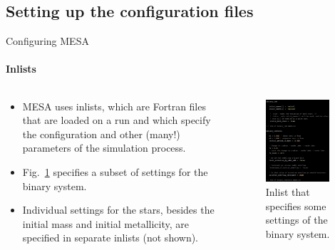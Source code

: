 \documentclass{beamer}
\begin{document}
\subsection{Setting up the configuration files}
\begin{frame}{Configuring MESA}
    \framesubtitle{Inlists}
    \begin{columns}
        \begin{column}{0.5\textwidth}
            \begin{itemize}
                \item<1-> MESA uses \alert{inlists}, which are Fortran files that are loaded on a run and which specify the configuration and other (many!) parameters of the simulation process.
                \item<2-> Fig.~\ref{fig:inlist_project_binary} specifies a subset of settings for the binary system.
                \item<3-> Individual settings for the stars, besides the initial mass and initial metallicity, are specified in separate inlists (not shown).
            \end{itemize}
        \end{column}
        \begin{column}{0.5\textwidth}
            \pause[2]
            \begin{figure}
                \includegraphics[width=0.9\textwidth]{figs/inlist_project_binary.png}
                \caption{Inlist that specifies some settings of the binary system.}
                \label{fig:inlist_project_binary}
            \end{figure}
        \end{column}
    \end{columns}
\end{frame}
\end{document}
